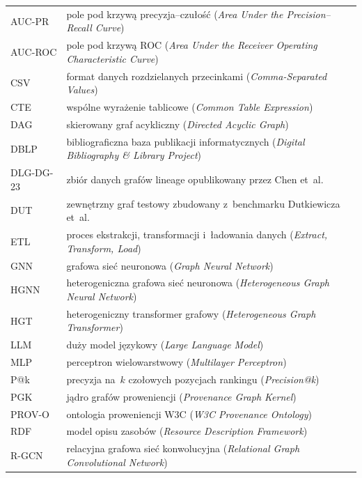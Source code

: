 \documentclass[polish,master,a4paper,oneside]{ppfcmthesis}
\renewcommand{\_}{\origtextunderscore\ifmmode\else\allowbreak\fi}
\begin{document}
\noindent\begin{tabularx}{\textwidth}{@{}lX@{}}
AUC-PR    & pole pod krzywą precyzja–czułość (\emph{Area Under the
             Precision–Recall Curve}) \\
AUC-ROC   & pole pod krzywą ROC (\emph{Area Under the Receiver Operating
             Characteristic Curve}) \\
CSV       & format danych rozdzielanych przecinkami (\emph{Comma-Separated
             Values}) \\
CTE       & wspólne wyrażenie tablicowe (\emph{Common Table Expression}) \\
DAG       & skierowany graf acykliczny (\emph{Directed Acyclic Graph}) \\
DBLP      & bibliograficzna baza publikacji informatycznych
             (\emph{Digital Bibliography \& Library Project}) \\
DLG-DG-23 & zbiór danych grafów lineage opublikowany przez Chen
             et~al.~\cite{Chen2024} \\
DUT       & zewnętrzny graf testowy zbudowany z~benchmarku Dutkiewicza
             et~al.~\cite{Dutkiewicz2026} \\
ETL       & proces ekstrakcji, transformacji i~ładowania danych
             (\emph{Extract, Transform, Load}) \\
GNN       & grafowa sieć neuronowa (\emph{Graph Neural Network}) \\
HGNN      & heterogeniczna grafowa sieć neuronowa (\emph{Heterogeneous
             Graph Neural Network}) \\
HGT       & heterogeniczny transformer grafowy (\emph{Heterogeneous Graph
             Transformer}) \\
LLM       & duży model językowy (\emph{Large Language Model}) \\
MLP       & perceptron wielowarstwowy (\emph{Multilayer Perceptron}) \\
P@k       & precyzja na~$k$ czołowych pozycjach rankingu
             (\emph{Precision@k}) \\
PGK       & jądro grafów proweniencji (\emph{Provenance Graph Kernel}) \\
PROV-O    & ontologia proweniencji W3C (\emph{W3C Provenance Ontology}) \\
RDF       & model opisu zasobów (\emph{Resource Description Framework}) \\
R-GCN     & relacyjna grafowa sieć konwolucyjna (\emph{Relational Graph
             Convolutional Network}) \\

\end{tabularx}
\end{document}

